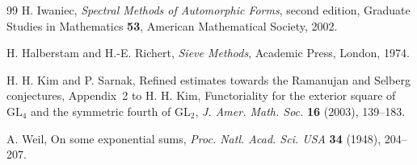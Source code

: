 \documentclass[10pt,reqno]{amsart}
\theoremstyle{definition}
\numberwithin{equation}{section}
\begin{document}
\begin{thebibliography}{99}
 H. Iwaniec,
\emph{Spectral Methods of Automorphic Forms}, second edition,
Graduate Studies in Mathematics \textbf{53}, American Mathematical Society, 2002.

 H. Halberstam and H.-E. Richert,
\emph{Sieve Methods}, Academic Press, London, 1974.

 H. H. Kim and P. Sarnak,
Refined estimates towards the Ramanujan and Selberg conjectures,
Appendix~2 to H. H. Kim, Functoriality for the exterior square of
$\mathrm{GL}_4$ and the symmetric fourth of $\mathrm{GL}_2$,
\emph{J. Amer. Math. Soc.} \textbf{16} (2003), 139--183.

 A. Weil,
On some exponential sums,
\emph{Proc. Natl. Acad. Sci. USA} \textbf{34} (1948), 204--207.

\end{thebibliography}
\end{document}

